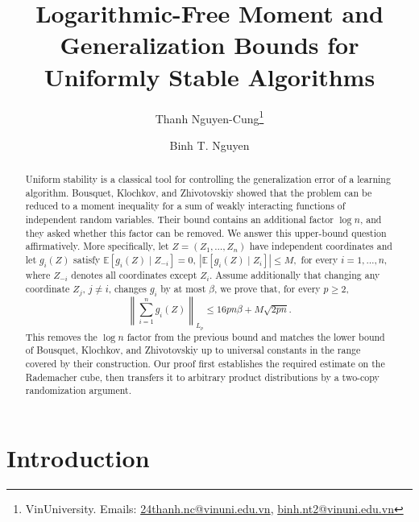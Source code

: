 \documentclass[11pt]{article}
\title{Logarithmic-Free Moment and Generalization Bounds for Uniformly
Stable Algorithms}
\author{
Thanh Nguyen-Cung\thanks{VinUniversity. Emails: \href{mailto:24thanh.nc@vinuni.edu.vn}{24thanh.nc@vinuni.edu.vn}, \href{mailto:binh.nt2@vinuni.edu.vn}{binh.nt2@vinuni.edu.vn}} 
\and 
Binh T. Nguyen\footnotemark[1]
}
\date{}
\newcommand{\E}{\mathbb{E}}
\newcommand{\norm}[1]{\left\lVert #1\right\rVert}
\newcommand{\abs}[1]{\left\lvert #1\right\rvert}
\begin{document}
\maketitle

\begin{abstract}
Uniform stability is a classical tool for controlling the generalization error of a learning algorithm. Bousquet, Klochkov, and Zhivotovskiy \cite{bkz2020} showed that the problem can be reduced to a moment inequality for a sum of weakly interacting functions of independent random variables. Their bound contains an additional factor $\log n$, and they asked whether this factor can be removed. We answer this upper-bound question affirmatively. More specifically, let $Z=(Z_1,\ldots,Z_n)$ have independent coordinates and let $g_i(Z)$ satisfy
\(\E[g_i(Z)\mid Z_{-i}]=0, \
\abs{\E[g_i(Z)\mid Z_i]}\le M,\) for every \(i = 1, \ldots, n,\)
where $Z_{-i}$ denotes all coordinates except $Z_i$. Assume additionally that changing any coordinate $Z_j$, $j\neq i$, changes $g_i$ by at most $\beta$, we prove that, for every $p\ge2$,
\[
\norm{\sum_{i=1}^n g_i(Z)}_{L_p}
\le 16pn\beta+M\sqrt{2pn}.
\]
This removes the $\log n$ factor from the previous bound and matches the lower bound of Bousquet, Klochkov, and Zhivotovskiy up to universal constants in the range covered by their construction.
Our proof first establishes the required estimate on the Rademacher cube, then transfers it to arbitrary product distributions by a two-copy randomization argument.
\end{abstract}

\section{Introduction}\label{sec:introduction}
\end{document}
